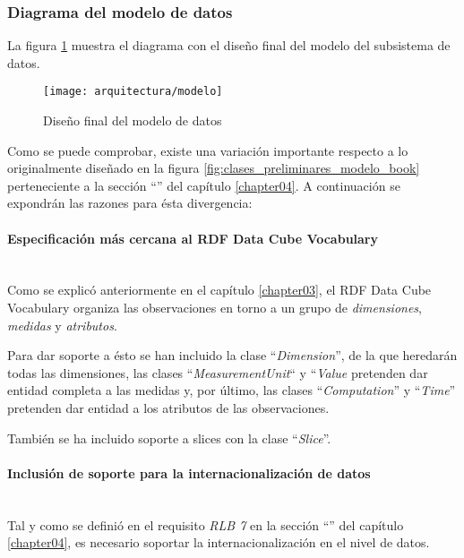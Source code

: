 \subsubsection{Diagrama del modelo de datos}
La figura \ref{fig:diagrama_modelo_final} muestra el diagrama con el diseño final del modelo del subsistema de datos.
\begin{landscape}
	\begin{figure}[h]
		\centering
		\texttt{[image: arquitectura/modelo]}
		\caption{Diseño final del modelo de datos}
		\label{fig:diagrama_modelo_final}
	\end{figure}
\end{landscape}

Como se puede comprobar, existe una variación importante respecto a lo originalmente diseñado en la figura \ref{fig:clases_preliminares_modelo_book} perteneciente a la sección ``'' del capítulo \ref{chapter04}.  A continuación se expondrán las razones para ésta divergencia:

\paragraph{Especificación más cercana al RDF Data Cube Vocabulary} \hfill \\
Como se explicó anteriormente en el capítulo \ref{chapter03}, el RDF Data Cube Vocabulary organiza las observaciones en torno a un grupo de \textit{dimensiones}, \textit{medidas} y \textit{atributos}.

Para dar soporte a ésto se han incluido la clase ``\textit{Dimension}'', de la que heredarán todas las dimensiones, las clases ``\textit{MeasurementUnit}`` y ``\textit{Value} pretenden dar entidad completa a las medidas y, por último, las clases ``\textit{Computation}'' y ``\textit{Time}'' pretenden dar entidad a los atributos de las observaciones.

También se ha incluido soporte a slices con la clase ``\textit{Slice}''.

\paragraph{Inclusión de soporte para la internacionalización de datos} \hfill \\
Tal y como se definió en el requisito \textit{RLB 7} en la sección ``'' del capítulo \ref{chapter04}, es necesario soportar la internacionalización en el nivel de datos.

